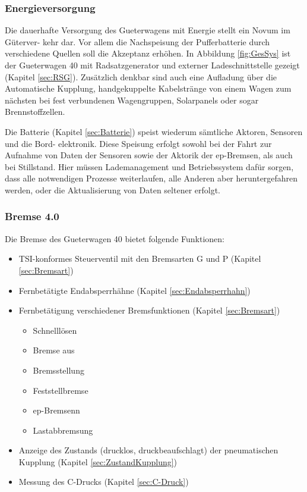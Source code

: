 \subsubsection{Energieversorgung}
Die dauerhafte Versorgung des \gls{Gueterwagen}s mit Energie stellt ein Novum im Güterver- kehr dar. Vor allem die Nachspeisung der Pufferbatterie durch verschiedene Quellen soll die Akzeptanz erhöhen. In Abbildung \ref{fig:GesSys} ist der \gls{Gueterwagen 40} mit Radsatzgenerator und externer Ladeschnittstelle gezeigt (Kapitel \ref{sec:RSG}). Zusätzlich denkbar sind auch eine Aufladung über die Automatische Kupplung, handgekuppelte Kabelstränge von einem Wagen zum nächsten bei fest verbundenen Wagengruppen, Solarpanels oder sogar Brennstoffzellen. %
\par
Die Batterie (Kapitel \ref{sec:Batterie}) speist wiederum sämtliche Aktoren, Sensoren und die Bord- elektronik. Diese Speisung erfolgt sowohl bei der Fahrt zur Aufnahme von Daten der Sensoren sowie der Aktorik der \gls{ep-Bremsen}, als auch bei Stillstand. Hier müssen Lademanagement und Betriebssystem %
dafür sorgen, dass alle notwendigen Prozesse weiterlaufen, alle Anderen aber heruntergefahren werden, oder die Aktualisierung von Daten seltener erfolgt.


\subsubsection{Bremse 4.0}
Die Bremse des \gls{Gueterwagen 40} bietet folgende Funktionen:
\begin{itemize}
    \item \acrshort{TSI}-konformes Steuerventil mit den \gls{Bremsart}en G und P (Kapitel \ref{sec:Bremsart})
    \item Fernbetätigte Endabsperrhähne (Kapitel \ref{sec:Endabsperrhahn})
    \item Fernbetätigung verschiedener Bremsfunktionen  (Kapitel \ref{sec:Bremsart})
    \begin{itemize}
        \item Schnelllösen
        \item Bremse aus
        \item Bremsstellung
        \item Feststellbremse
        \item \gls{ep-Bremsen}n
        \item Lastabbremsung
    \end{itemize}
    \item Anzeige des Zustands (drucklos, druckbeaufschlagt) der pneumatischen Kupplung (Kapitel \ref{sec:ZustandKupplung})
    \item Messung des C-Drucks (Kapitel \ref{sec:C-Druck})
\end{itemize}


